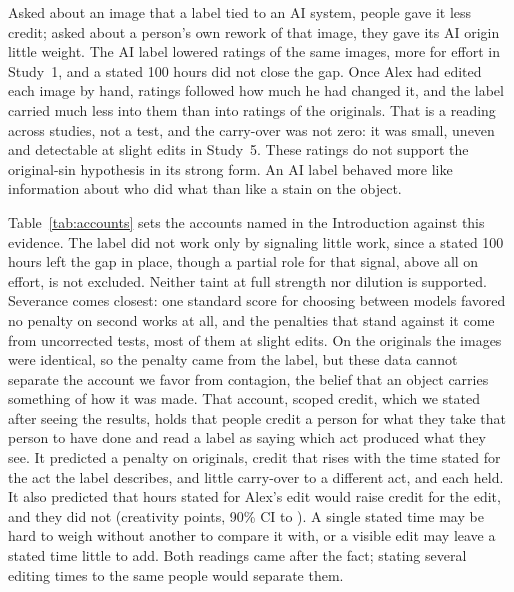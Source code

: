 
Asked about an image that a label tied to an AI system, people gave it less credit; asked about a person's own rework of that image, they gave its AI origin little weight. The AI label lowered ratings of the same images, more for effort in Study~1, and a stated 100 hours did not close the gap. Once Alex had edited each image by hand, ratings followed how much he had changed it, and the label carried much less into them than into ratings of the originals. That is a reading across studies, not a test, and the carry-over was not zero: it was small, uneven and detectable at slight edits in Study~5. These ratings do not support the original-sin hypothesis in its strong form. An AI label behaved more like information about who did what than like a stain on the object.



Table~\ref{tab:accounts} sets the accounts named in the Introduction against this evidence. The label did not work only by signaling little work, since a stated 100 hours left the gap in place, though a partial role for that signal, above all on effort, is not excluded. Neither taint at full strength nor dilution is supported. Severance comes closest: one standard score for choosing between models favored no penalty on second works at all, and the penalties that stand against it come from uncorrected tests, most of them at slight edits. On the originals the images were identical, so the penalty came from the label, but these data cannot separate the account we favor from contagion, the belief that an object carries something of how it was made. That account, scoped credit, which we stated after seeing the results, holds that people credit a person for what they take that person to have done and read a label as saying which act produced what they see. It predicted a penalty on originals, credit that rises with the time stated for the act the label describes, and little carry-over to a different act, and each held. It also predicted that hours stated for Alex's edit would raise credit for the edit, and they did not (creativity \SFiveCreatEditTimeContrastEst{} points, 90\% CI \SFiveCreatEditTimeContrastLoNinety{} to \SFiveCreatEditTimeContrastHiNinety). A single stated time may be hard to weigh without another to compare it with, or a visible edit may leave a stated time little to add. Both readings came after the fact; stating several editing times to the same people would separate them.

